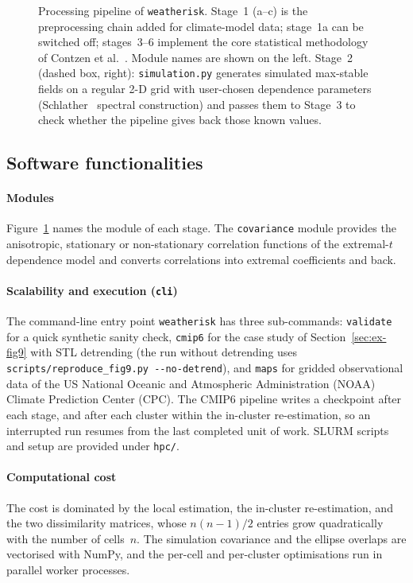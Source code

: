 \documentclass[preprint,12pt,a4paper]{elsarticle}
\newcommand{\rev}[1]{{#1}}
\newcommand{\revt}[1]{{#1}}
\begin{document}
\begin{figure}[ht]
\begin{tikzpicture}
\end{tikzpicture}
\caption{\rev{Processing pipeline of \texttt{weatherisk}. Stage~1
  (a--c) is the preprocessing chain added for climate-model data;
  stage~1a can be switched off;
  stages~3--6 implement the core statistical methodology of Contzen
  et al.~\cite{contzen2025}. Module names are shown on the left.\revt{ Stage~2
  (dashed box, right): \texttt{simulation.py} generates simulated
  max-stable fields on a regular 2-D grid with user-chosen dependence
  parameters (Schlather~\cite{schlather2002} spectral construction) and passes them to
  Stage~3 to check whether the pipeline gives back those known
  values.}}}
\label{fig:workflow}
\end{figure}

\subsection{Software functionalities}
\label{sec:functionalities}

\paragraph{Modules}
Figure~\ref{fig:workflow} names the module of each stage. The \texttt{covariance} module provides
the anisotropic, stationary or non-stationary correlation functions
of the extremal-$t$ dependence model and converts correlations into
extremal coefficients and back.

\paragraph{Scalability and execution (\texttt{cli})}
The command-line entry point
\texttt{weatherisk} has three sub-commands: \texttt{validate} for a
quick synthetic sanity check, \texttt{cmip6} for the case study of
Section~\ref{sec:ex-fig9} with STL detrending (the run without
detrending uses \texttt{scripts/reproduce\_fig9.py -{}-no-detrend}),
and \texttt{maps} for gridded observational data of the US National
Oceanic and Atmospheric Administration (NOAA) Climate Prediction
Center (CPC). The CMIP6 pipeline writes a checkpoint after each
stage, and after each cluster within the in-cluster re-estimation, so an
interrupted run resumes from the last completed unit of work.
SLURM scripts and setup are provided
under \texttt{hpc/}.

\paragraph{Computational cost}
The cost is dominated by the local estimation, the in-cluster
re-estimation, and the two dissimilarity matrices, whose $n(n-1)/2$
entries grow quadratically with the number of cells~$n$. The
simulation covariance and the ellipse overlaps are vectorised with
NumPy, and the per-cell and per-cluster optimisations run in
parallel worker processes.
\end{document}
